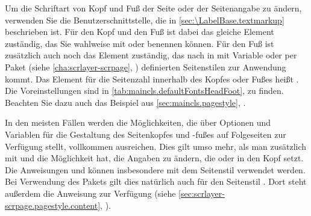 \BeginIndexGroup
{}%
%
%
%
Um die Schriftart von Kopf und Fuß der Seite oder der Seitenangabe zu ändern,
verwenden Sie die Benutzerschnittstelle, die in
\autoref{sec:\LabelBase.textmarkup} beschrieben ist. Für den Kopf und den Fuß
ist dabei das gleiche Element zuständig, das Sie wahlweise mit
 oder
 benennen können. Für den
Fuß ist zusätzlich auch noch das Element
 zuständig, das nach
 in mit Variable
 oder per Paket
\hyperref[cha:scrlayer-scrpage]{}%
%
 (siehe
\autoref{cha:scrlayer-scrpage},
) definierten Seitenstilen
zur Anwendung kommt. Das Element für die Seitenzahl innerhalb des Kopfes oder
Fußes heißt . Die
Voreinstellungen sind in \autoref{tab:maincls.defaultFontsHeadFoot},
 zu finden. Beachten Sie dazu
auch das Beispiel aus \autoref{sec:maincls.pagestyle},
.%
%
\EndIndexGroup
%
\EndIndexGroup


\begin{Declaration}
\end{Declaration}
In den meisten Fällen werden die Möglichkeiten, die \KOMAScript{} über
Optionen und Variablen für die Gestaltung des Seitenkopfes und
-fußes auf Folgeseiten zur Verfügung stellt,
vollkommen ausreichen.  Dies gilt umso mehr, als man zusätzlich mit
 und  die Möglichkeit hat, die Angaben zu
ändern, die  oder  in den Kopf setzt.  Die
Anweisungen  und
 können insbesondere mit dem Seitenstil
%
 verwendet
werden. Bei Verwendung des Pakets
\hyperref[cha:scrlayer-scrpage]{}%
%
 gilt
dies natürlich auch für den Seitenstil %
.  Dort steht
außerdem die Anweisung %
 zur
Verfügung (siehe \autoref{sec:scrlayer-scrpage.pagestyle.content},
).

